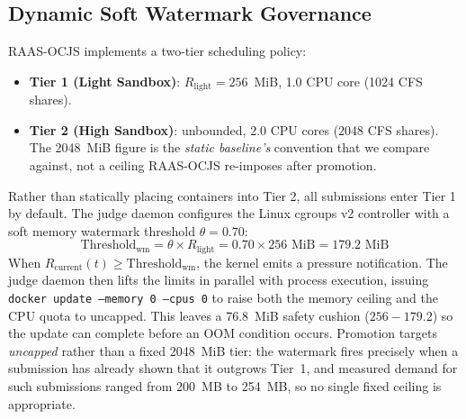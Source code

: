\documentclass[conference]{IEEEtran}
\begin{document}
\subsection{Dynamic Soft Watermark Governance}
RAAS-OCJS implements a two-tier scheduling policy:
\begin{itemize}
    \item \textbf{Tier 1 (Light Sandbox)}: $R_{\mathrm{light}} = 256$~MiB, 1.0 CPU core (1024 CFS shares).
    \item \textbf{Tier 2 (High Sandbox)}: unbounded, 2.0 CPU cores (2048 CFS shares). The 2048~MiB figure is the \emph{static baseline's} convention that we compare against, not a ceiling RAAS-OCJS re-imposes after promotion.
\end{itemize}
Rather than statically placing containers into Tier 2, all submissions enter Tier 1 by default. The judge daemon configures the Linux cgroups v2 controller with a soft memory watermark threshold $\theta = 0.70$:
\begin{equation}
\mathrm{Threshold}_{\mathrm{wm}} = \theta \times R_{\mathrm{light}} = 0.70 \times 256\text{ MiB} = 179.2\text{ MiB}
\end{equation}
When $R_{\mathrm{current}}(t) \ge \mathrm{Threshold}_{\mathrm{wm}}$, the kernel emits a pressure notification. The judge daemon then lifts the limits in parallel with process execution, issuing \texttt{docker update --memory 0 --cpus 0} to raise both the memory ceiling and the CPU quota to uncapped. This leaves a 76.8~MiB safety cushion ($256 - 179.2$) so the update can complete before an OOM condition occurs. Promotion targets \emph{uncapped} rather than a fixed 2048~MiB tier: the watermark fires precisely when a submission has already shown that it outgrows Tier~1, and measured demand for such submissions ranged from 200~MB to 254~MB, so no single fixed ceiling is appropriate.
\end{document}
